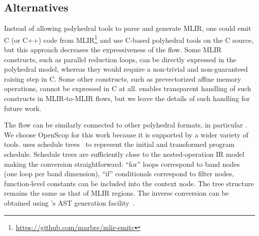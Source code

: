 \subsection{Alternatives}

Instead of allowing polyhedral tools to parse and generate MLIR, one could emit C (or C++) code from MLIR\footnote{\url{https://github.com/marbre/mlir-emitc}} and use C-based polyhedral tools on the C source, but this approach decreases the expressiveness of the flow. Some MLIR constructs, such as parallel reduction loops, can be directly expressed in the polyhedral model, whereas they would require a non-trivial and non-guaranteed raising step in C. Some other constructs, such as prevectorized affine memory operations, cannot be expressed in C at all. \tool enables transparent handling of such constructs in MLIR-to-MLIR flows, but we leave the details of such handling for future work.

The \tool flow can be similarly connected to other polyhedral formats, in particular . We choose OpenScop for this work because it is supported by a wider variety of tools.  uses schedule trees~\cite{schedule_trees} to represent the initial and transformed program schedule. Schedule trees are sufficiently close to the nested-operation IR model making the conversion straightforward: ``for'' loops correspond to band nodes (one loop per band dimension), ``if'' conditionals correspond to filter nodes, function-level constants can be included into the context node. The tree structure remains the same as that of MLIR regions. The inverse conversion can be obtained using 's AST generation facility~\cite{grosser2015polyhedral}.